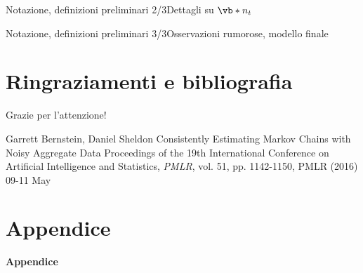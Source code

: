 \documentclass[10pt,xcolor={table,dvipsnames}]{beamer} 		%
\theoremstyle{plain}					%
\theoremstyle{definition}
\theoremstyle{remark}
\begin{document}
	\begin{frame}{Notazione, definizioni preliminari 2/3}{Dettagli su $\vb*{n}_t$}
		
	\end{frame}

	\begin{frame}{Notazione, definizioni preliminari 3/3}{Osservazioni rumorose, modello finale}
		
	\end{frame}











	

    
\section{Ringraziamenti e bibliografia}
    \begin{frame}
        \begin{center}
            \Huge{Grazie per l'attenzione!}
        \end{center}
    \end{frame}

	\begin{frame}{\refname}
		\begin{thebibliography}{9}
			 Garrett Bernstein, Daniel Sheldon
			\newblock Consistently Estimating Markov Chains with Noisy Aggregate Data
			\newblock Proceedings of the 19th International Conference on Artificial Intelligence and Statistics, \emph{PMLR}, vol. 51, pp. 1142-1150, PMLR (2016) 09-11 May

		\end{thebibliography}
	\end{frame}

\section*{Appendice}
	\begin{frame}
		\begin{center}
			\Huge{\textbf{Appendice}}
		\end{center}
	\end{frame}
\end{document}
